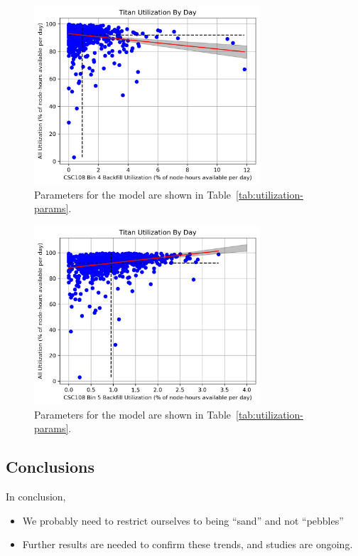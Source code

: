 \begin{figure}
  \includegraphics[width=0.75\textwidth]{images/linfit-utilization-by-true-day-bin4.png}
\caption{Parameters for the model are shown in
    Table~\ref{tab:utilization-params}.}
\label{fig:utilization-bin4}
\end{figure}


\begin{figure}
  \includegraphics[width=0.75\textwidth]{images/linfit-utilization-by-true-day-bin5.png}
\caption{Parameters for the model are shown in
    Table~\ref{tab:utilization-params}.}
\label{fig:utilization-bin5}
\end{figure}


\subsection{Conclusions}
\label{subsec:sec4-conclusions}

In conclusion,
\begin{itemize}
    \item We probably need to restrict ourselves to being ``sand'' and not
        ``pebbles''
    \item Further results are needed to confirm these trends, and studies are
        ongoing.
\end{itemize}


